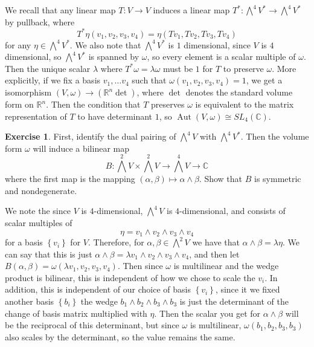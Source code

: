 \documentclass[psamsfonts]{amsart}
\theoremstyle{definition}
\newtheorem{exer}[thm]{Exercise}
\theoremstyle{remark}
\newcommand{\R}{\mathbb{R}}
\newcommand{\C}{\mathbb{C}}
\newcommand{\set}[1]{\left\lbrace #1 \right\rbrace}
\DeclareMathOperator{\Aut}{Aut}
\begin{document}
We recall that any linear map $T : V \to V$ induces a linear map $T^* : \bigwedge^4V^* \to \bigwedge^4V^*$ by pullback, where
$$T^*\eta(v_1,v_2,v_3,v_4) = \eta(Tv_1,Tv_2,Tv_3,Tv_4) $$
for any $\eta \in \bigwedge^4V^*$. We also note that $\bigwedge^4V^*$ is $1$ dimensional, since $V$ is $4$ dimensional, so $\bigwedge^4V^*$ is spanned by $\omega$, so every element is a scalar multiple of $\omega$. Then the unique scalar $\lambda$ where $T^*\omega = \lambda \omega$ must be $1$ for $T$ to preserve $\omega$. More explicitly, if we fix a basis $v_1, \ldots v_4$ such that $\omega(v_1,v_2,v_3,v_4) = 1$, we get a isomorphism $(V,\omega) \to (\R^n \det)$, where $\det$ denotes the standard volume form on $\R^n$. Then the condition that $T$ preserves $\omega$ is equivalent to the matrix representation of $T$ to have determinant $1$, so $\Aut(V, \omega) \cong SL_4(\C)$.
%
\begin{exer}
First, identify the dual pairing of $\bigwedge^4 V$ with $\bigwedge^4V^*$. Then the volume form $\omega$ will induce a bilinear map
$$B : \bigwedge^2V \times \bigwedge^2V \to \bigwedge^4V \to \C $$
where the first map is the mapping $(\alpha,\beta) \mapsto \alpha \wedge \beta$. Show that $B$ is symmetric and nondegenerate.
\end{exer}
%
We note the since $V$ is $4$-dimensional, $\bigwedge^4 V$ is $4$-dimensional, and consists of scalar multiples of 
$$\eta = v_1 \wedge v_2 \wedge v_3 \wedge v_4$$
for a basis $\set{v_i}$ for $V$. Therefore, for $\alpha,\beta \in \bigwedge^2V$ we have that $\alpha \wedge \beta = \lambda \eta$. We can say that this is just $\alpha \wedge \beta = \lambda v_1 \wedge v_2 \wedge v_3 \wedge v_4$, and then let $B(\alpha, \beta) = \omega(\lambda v_1, v_2, v_3, v_4)$. Then since $\omega$ is multilinear and the wedge product is bilinear, this is independent of how we chose to scale the $v_i$. In addition, this is independent of our choice of basis $\set{v_i}$, since it we fixed another basis $\set{b_i}$ the wedge $b_1 \wedge b_2 \wedge b_3 \wedge b_3$ is just the determinant of the change of basis matrix multiplied with $\eta$. Then the scalar you get for $\alpha \wedge \beta$ will be the reciprocal of this determinant, but since $\omega$ is multilinear, $\omega(b_1, b_2, b_3, b_3)$ also scales by the determinant, so the value remains the same.
\end{document}
